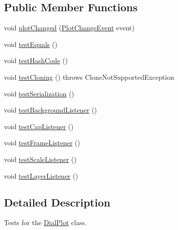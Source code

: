 \subsection*{Public Member Functions}
\begin{DoxyCompactItemize}
\item 
void \mbox{\hyperlink{classorg_1_1jfree_1_1chart_1_1plot_1_1dial_1_1_dial_plot_test_ab4ae95b9ccee351cf787f78d8727753b}{plot\+Changed}} (\mbox{\hyperlink{classorg_1_1jfree_1_1chart_1_1event_1_1_plot_change_event}{Plot\+Change\+Event}} event)
\item 
void \mbox{\hyperlink{classorg_1_1jfree_1_1chart_1_1plot_1_1dial_1_1_dial_plot_test_a3f7bf541ea94aa98744b938edd320d2e}{test\+Equals}} ()
\item 
void \mbox{\hyperlink{classorg_1_1jfree_1_1chart_1_1plot_1_1dial_1_1_dial_plot_test_af758e04cc274dba8930a766dd4c86fc4}{test\+Hash\+Code}} ()
\item 
void \mbox{\hyperlink{classorg_1_1jfree_1_1chart_1_1plot_1_1dial_1_1_dial_plot_test_abd4128c57bdd64ce8f3c3819b646437b}{test\+Cloning}} ()  throws Clone\+Not\+Supported\+Exception 
\item 
void \mbox{\hyperlink{classorg_1_1jfree_1_1chart_1_1plot_1_1dial_1_1_dial_plot_test_a6b12e219db2abd9710dd43a07c6f7ee6}{test\+Serialization}} ()
\item 
void \mbox{\hyperlink{classorg_1_1jfree_1_1chart_1_1plot_1_1dial_1_1_dial_plot_test_ab4ca91ada593bf4e9f512a7684f3fb2d}{test\+Background\+Listener}} ()
\item 
void \mbox{\hyperlink{classorg_1_1jfree_1_1chart_1_1plot_1_1dial_1_1_dial_plot_test_a09640e0b36120e68ff187d906f624e5b}{test\+Cap\+Listener}} ()
\item 
void \mbox{\hyperlink{classorg_1_1jfree_1_1chart_1_1plot_1_1dial_1_1_dial_plot_test_a4469019853e932b553c83f36cc29f1d4}{test\+Frame\+Listener}} ()
\item 
void \mbox{\hyperlink{classorg_1_1jfree_1_1chart_1_1plot_1_1dial_1_1_dial_plot_test_a354c2fedadadd6ef16d1275b4caaddc8}{test\+Scale\+Listener}} ()
\item 
void \mbox{\hyperlink{classorg_1_1jfree_1_1chart_1_1plot_1_1dial_1_1_dial_plot_test_abc92b886d77bd73f8f625fea49988216}{test\+Layer\+Listener}} ()
\end{DoxyCompactItemize}


\subsection{Detailed Description}
Tests for the \mbox{\hyperlink{classorg_1_1jfree_1_1chart_1_1plot_1_1dial_1_1_dial_plot}{Dial\+Plot}} class. 

